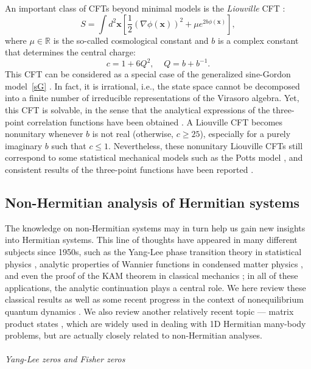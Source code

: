 \documentclass{tADP2e}
\theoremstyle{plain}
\theoremstyle{plain}
\theoremstyle{definition}
\begin{document}
\vspace{3pt}
\noindent
An important class of CFTs beyond minimal models is the \emph{Liouville} CFT  \cite{SN1990}:
\begin{equation}
S=\int d^2\boldsymbol{x}\left[\frac{1}{2}(\nabla\phi(\boldsymbol{x}))^2+\mu e^{2b\phi(\boldsymbol{x})}\right],\label{livcft}
\end{equation}
where $\mu\in{\mathbb R}$ is the so-called cosmological constant and $b$ is a complex constant that determines the central charge:
\begin{equation}
c=1+6Q^2,\;\;\;\;Q=b+b^{-1}.
\end{equation}
This CFT can be considered as a special case of the generalized sine-Gordon model~\eqref{sG} \cite{CMB05,YA17nc}. In fact, it is irrational, i.e., the state space cannot be decomposed into a finite number of irreducible representations of the Virasoro algebra. Yet, this CFT is solvable, in the sense that the analytical expressions of the three-point correlation functions have been obtained \cite{HD92,AZ96}. A Liouville CFT becomes nonunitary whenever $b$ is not real (otherwise, $c\ge 25$), especially for a purely imaginary $b$ such that $c\le 1$. Nevertheless, these nonunitary Liouville CFTs still correspond to some statistical mechanical models such as the Potts model \cite{MP13}, and consistent results of the three-point functions have been reported \cite{IY16}. 


\subsection{Non-Hermitian analysis of Hermitian systems}
\label{Sec:NHH}
The knowledge on non-Hermitian systems may in turn help us gain new insights into Hermitian systems. 
This line of thoughts have appeared in many different subjects since 1950s, such as the Yang-Lee phase transition theory in statistical physics \cite{LTD52}, analytic properties of Wannier functions in condensed matter physics \cite{KW59}, and even the proof of the KAM theorem in classical mechanics \cite{AVI63}; in all of these applications, the analytic continuation  plays a central role. We here review these classical results as well as some recent progress in the context of nonequilibrium quantum dynamics \cite{EJ15}. We also review another relatively recent topic --- matrix product states \cite{MF92,perez07mps,FV08}, which are widely used in dealing with 1D Hermitian many-body problems, but are actually closely related to non-Hermitian analyses.
\\ \\ {\it Yang-Lee zeros and Fisher zeros} 
\end{document}
